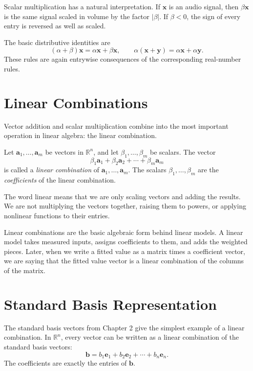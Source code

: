 Scalar multiplication has a natural interpretation. If \(\mathbf{x}\) is an audio signal, then \(\beta\mathbf{x}\) is the same signal scaled in volume by the factor \(|\beta|\). If \(\beta<0\), the sign of every entry is reversed as well as scaled.

The basic distributive identities are
\[
(\alpha+\beta)\mathbf{x}=\alpha\mathbf{x}+\beta\mathbf{x},
\qquad
\alpha(\mathbf{x}+\mathbf{y})=\alpha\mathbf{x}+\alpha\mathbf{y}.
\]
These rules are again entrywise consequences of the corresponding real-number rules.

\section{Linear Combinations}
\label{mf:linear-combinations}
\label{mf:linear-combination-coefficients}

Vector addition and scalar multiplication combine into the most important operation in linear algebra: the linear combination.

Let \(\mathbf{a}_1,\ldots,\mathbf{a}_m\) be vectors in \(\mathbb{R}^n\), and let \(\beta_1,\ldots,\beta_m\) be scalars. The vector
\[
\beta_1\mathbf{a}_1+\beta_2\mathbf{a}_2+\cdots+\beta_m\mathbf{a}_m
\]
is called a \emph{linear combination} of \(\mathbf{a}_1,\ldots,\mathbf{a}_m\). The scalars \(\beta_1,\ldots,\beta_m\) are the \emph{coefficients} of the linear combination.

The word linear means that we are only scaling vectors and adding the results. We are not multiplying the vectors together, raising them to powers, or applying nonlinear functions to their entries.

Linear combinations are the basic algebraic form behind linear models. A linear model takes measured inputs, assigns coefficients to them, and adds the weighted pieces. Later, when we write a fitted value as a matrix times a coefficient vector, we are saying that the fitted value vector is a linear combination of the columns of the matrix.

\section{Standard Basis Representation}
\label{mf:standard-basis-linear-combinations}

The standard basis vectors from Chapter 2 give the simplest example of a linear combination. In \(\mathbb{R}^n\), every vector can be written as a linear combination of the standard basis vectors:
\[
\mathbf{b}=b_1\mathbf{e}_1+b_2\mathbf{e}_2+\cdots+b_n\mathbf{e}_n.
\]
The coefficients are exactly the entries of \(\mathbf{b}\).

